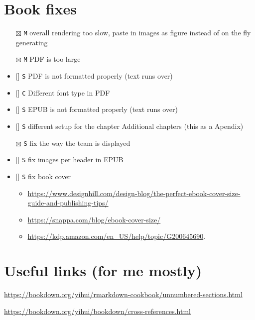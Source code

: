 \documentclass[
]{book}
\newcommand{\passthrough}[1]{#1}
\providecommand{\tightlist}{%
  \setlength{\itemsep}{0pt}\setlength{\parskip}{0pt}}
\begin{document}
\hypertarget{book-fixes}{%
\section{Book fixes}\label{book-fixes}}

\begin{itemize}
\tightlist
\item[$\boxtimes$]
  \passthrough{\lstinline!M!} overall rendering too slow, paste in images as figure instead of on the fly generating
\item[$\boxtimes$]
  \passthrough{\lstinline!M!} PDF is too large
\item
  {[}{]} \passthrough{\lstinline!S!} PDF is not formatted properly (text runs over)
\item
  {[}{]} \passthrough{\lstinline!C!} Different font type in PDF
\item
  {[}{]} \passthrough{\lstinline!S!} EPUB is not formatted properly (text runs over)
\item
  {[}{]} \passthrough{\lstinline!S!} different setup for the chapter Additional chapters (this as a Apendix)
\item[$\boxtimes$]
  \passthrough{\lstinline!S!} fix the way the team is displayed
\item
  {[}{]} \passthrough{\lstinline!S!} fix images per header in EPUB
\item
  {[}{]} \passthrough{\lstinline!S!} fix book cover

  \begin{itemize}
  \tightlist
  \item
    \url{https://www.designhill.com/design-blog/the-perfect-ebook-cover-size-guide-and-publishing-tips/}
  \item
    \url{https://snappa.com/blog/ebook-cover-size/}
  \item
    \url{https://kdp.amazon.com/en_US/help/topic/G200645690}.
  \end{itemize}
\end{itemize}

\hypertarget{useful-links-for-me-mostly}{%
\section{Useful links (for me mostly)}\label{useful-links-for-me-mostly}}

\url{https://bookdown.org/yihui/rmarkdown-cookbook/unnumbered-sections.html}

\url{https://bookdown.org/yihui/bookdown/cross-references.html}
\end{document}
